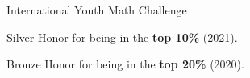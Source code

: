 \entryItem
	{International Youth Math Challenge}
	{}

	\begin{items}
		\item Silver Honor for being in the \textbf{top 10\%} (2021).
		\item Bronze Honor for being in the \textbf{top 20\%} (2020).
	\end{items}
